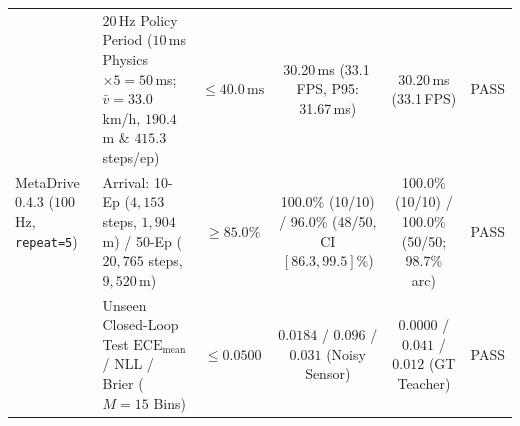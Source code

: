 \documentclass[10pt,twocolumn,letterpaper]{article}
\begin{document}
\begin{table}[t]
{\begin{tabular}{llcccc}
\midrule
\multirow{3}{*}{MetaDrive 0.4.3 ($100$\,Hz, \texttt{repeat=5})} 
 & $20$\,Hz Policy Period ($10$\,ms Physics $\times 5 = 50$\,ms; $\bar{v}=33.0$\,km/h, $190.4$\,m \& $415.3$ steps/ep) & $\le 40.0\,\text{ms}$ & 30.20\,ms (33.1\,FPS, P95: 31.67\,ms) & 30.20\,ms (33.1\,FPS) & PASS \\
 & Arrival: 10-Ep ($4,153$ steps, $1,904$\,m) / 50-Ep ($20,765$ steps, $9,520$\,m) & $\ge 85.0\%$ & 100.0\% (10/10) / 96.0\% (48/50, CI $[86.3, 99.5]\%$) & 100.0\% (10/10) / 100.0\% (50/50; 98.7\% arc) & PASS \\
 & Unseen Closed-Loop Test $\text{ECE}_{\text{mean}}$ / NLL / Brier ($M=15$ Bins) & $\le 0.0500$ & $0.0184$ / $0.096$ / $0.031$ (Noisy Sensor) & $0.0000$ / $0.041$ / $0.012$ (GT Teacher) & PASS \\
\bottomrule
\end{tabular}%
}
\end{table}
\end{document}
